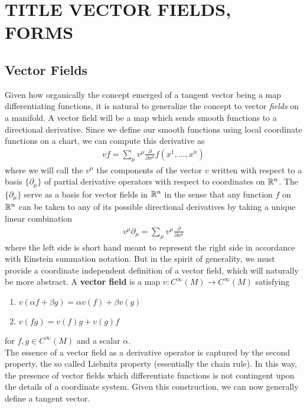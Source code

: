 \section*{TITLE VECTOR FIELDS, FORMS}
\subsection*{Vector Fields}
Given how organically the concept emerged of a tangent vector  being a map differentiating functions, it is natural to generalize the concept to vector \textit{fields} on a manifold.   A vector field will be a map which sends smooth functions to a directional derivative.  Since we define our smooth functions using local coordinate functions on a chart, we can compute this derivative as
\begin{align*}
	vf = \sum\limits_\mu v^\mu \frac{\partial}{\partial x^\mu}f(x^1, ..., x^n)
\end{align*} 
where we will call the $v^\mu$ the components of the vector $v$ written with respect to a basis $\{\partial_\mu \}$ of partial derivative operators with respect to coordinates on $\mathbb{R}^n$.  The $\{\partial_\mu\}$ serve as a basis for vector fields in $\mathbb{R}^n$ in the sense that any function $f$ on $\mathbb{R}^n$ can be taken to any of its possible directional derivatives by taking a unique linear combination 
\begin{align*}
	v^\mu\partial_\mu = \sum\limits_\mu v^\mu \frac{\partial}{\partial x^\mu}
\end{align*}
where the left side is short hand meant to represent the right side in accordance with Einstein summation notation.  But in the spirit of generality, we must provide a coordinate independent definition of a vector field, which will naturally be more abstract.  A \textbf{vector field} is a map $v: C^\infty(M) \to C^\infty(M)$ satisfying 
\begin{enumerate}
	\item $v(\alpha f+\beta g) = \alpha v(f)+\beta v(g)$
	\item $v(fg) = v(f)g+v(g)f$
\end{enumerate}
for $f, g \in C^\infty(M)$ and a scalar $\alpha$.\\

The essence of a vector field as a derivative operator is captured by the second property, the so called Liebnitz property (essentially the chain rule).  In this way, the presence of vector fields which differentiate functions is not contingent upon the details of a coordinate system.  Given this construction, we can now generally define a tangent vector.\\

